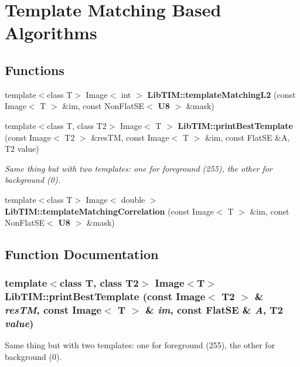 \section{Template Matching Based Algorithms}
\label{group__templateMatching}
\subsection*{Functions}
\begin{CompactItemize}
\item 
template$<$class T$>$ Image$<$ int $>$ {\bf Lib\-TIM::template\-Matching\-L2} (const Image$<$ T $>$ \&im, const Non\-Flat\-SE$<$ {\bf U8} $>$ \&mask)
\item 
template$<$class T, class T2$>$ Image$<$ T $>$ {\bf Lib\-TIM::print\-Best\-Template} (const Image$<$ T2 $>$ \&res\-TM, const Image$<$ T $>$ \&im, const Flat\-SE \&A, T2 value)
\begin{CompactList}\small\item\em Same thing but with two templates: one for foreground (255), the other for background (0). \item\end{CompactList}\item 
template$<$class T$>$ Image$<$ double $>$ {\bf Lib\-TIM::template\-Matching\-Correlation} (const Image$<$ T $>$ \&im, const Non\-Flat\-SE$<$ {\bf U8} $>$ \&mask)
\end{CompactItemize}


\subsection{Function Documentation}
\subsubsection{\setlength{\rightskip}{0pt plus 5cm}template$<$class T, class T2$>$ Image$<$T$>$ Lib\-TIM::print\-Best\-Template (const Image$<$ T2 $>$ \& {\em res\-TM}, const Image$<$ T $>$ \& {\em im}, const Flat\-SE \& {\em A}, T2 {\em value})}\label{group__templateMatching_ga1}


Same thing but with two templates: one for foreground (255), the other for background (0). 

